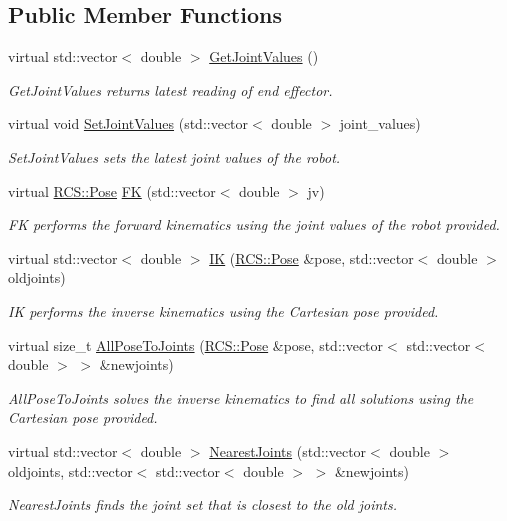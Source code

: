 \subsection*{Public Member Functions}
\begin{DoxyCompactItemize}
\item 
virtual std\-::vector$<$ double $>$ \hyperlink{classDummyKinematics_a630b1a37d23881be53147c07a87bffad}{Get\-Joint\-Values} ()
\begin{DoxyCompactList}\small\item\em Get\-Joint\-Values returns latest reading of end effector. \end{DoxyCompactList}\item 
virtual void \hyperlink{classDummyKinematics_a0b5a581fb840f304cebc80fb00eb7138}{Set\-Joint\-Values} (std\-::vector$<$ double $>$ joint\-\_\-values)
\begin{DoxyCompactList}\small\item\em Set\-Joint\-Values sets the latest joint values of the robot. \end{DoxyCompactList}\item 
virtual \hyperlink{namespaceRCS_aa07e45d8a50e30064283d2b38087f999}{R\-C\-S\-::\-Pose} \hyperlink{classDummyKinematics_a20570667281ca242ed0bf51b0f58222c}{F\-K} (std\-::vector$<$ double $>$ jv)
\begin{DoxyCompactList}\small\item\em F\-K performs the forward kinematics using the joint values of the robot provided. \end{DoxyCompactList}\item 
virtual std\-::vector$<$ double $>$ \hyperlink{classDummyKinematics_aed9dcd58e607ccfef58975040567a04a}{I\-K} (\hyperlink{namespaceRCS_aa07e45d8a50e30064283d2b38087f999}{R\-C\-S\-::\-Pose} \&pose, std\-::vector$<$ double $>$ oldjoints)
\begin{DoxyCompactList}\small\item\em I\-K performs the inverse kinematics using the Cartesian pose provided. \end{DoxyCompactList}\item 
virtual size\-\_\-t \hyperlink{classDummyKinematics_ac96c0c98a0ca7847ae38152c6de17d1c}{All\-Pose\-To\-Joints} (\hyperlink{namespaceRCS_aa07e45d8a50e30064283d2b38087f999}{R\-C\-S\-::\-Pose} \&pose, std\-::vector$<$ std\-::vector$<$ double $>$ $>$ \&newjoints)
\begin{DoxyCompactList}\small\item\em All\-Pose\-To\-Joints solves the inverse kinematics to find all solutions using the Cartesian pose provided. \end{DoxyCompactList}\item 
virtual std\-::vector$<$ double $>$ \hyperlink{classDummyKinematics_a5069cce91772b48d105065f12f6e15bc}{Nearest\-Joints} (std\-::vector$<$ double $>$ oldjoints, std\-::vector$<$ std\-::vector$<$ double $>$ $>$ \&newjoints)
\begin{DoxyCompactList}\small\item\em Nearest\-Joints finds the joint set that is closest to the old joints. \end{DoxyCompactList}\end{DoxyCompactItemize}


